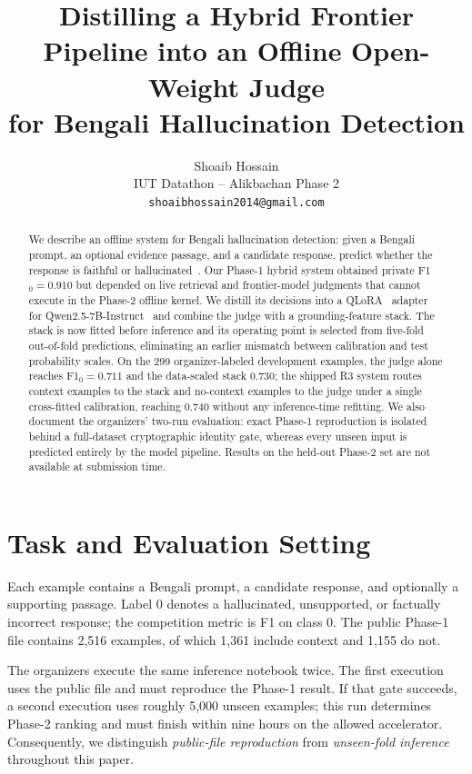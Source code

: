 \documentclass[11pt]{article}
\title{Distilling a Hybrid Frontier Pipeline into an Offline Open-Weight Judge\\
for Bengali Hallucination Detection}
\author{Shoaib Hossain \\
  IUT Datathon -- Alikbachan Phase 2 \\
  \texttt{shoaibhossain2014@gmail.com}}
\begin{document}
\maketitle

\begin{abstract}
We describe an offline system for Bengali hallucination detection: given a Bengali
prompt, an optional evidence passage, and a candidate response, predict whether the
response is faithful or hallucinated~\citep{halu}. Our Phase-1 hybrid system obtained
private F1$_0=0.910$ but depended on live retrieval and frontier-model judgments that
cannot execute in the Phase-2 offline kernel. We distill its decisions into a
QLoRA~\citep{qlora} adapter for Qwen2.5-7B-Instruct~\citep{qwen25} and combine the
judge with a grounding-feature stack. The stack is now fitted before inference and
its operating point is selected from five-fold out-of-fold predictions, eliminating
an earlier mismatch between calibration and test probability scales. On the 299
organizer-labeled development examples, the judge alone reaches F1$_0=0.711$ and the
data-scaled stack $0.730$; the shipped R3 system routes context examples to the stack
and no-context examples to the judge under a single cross-fitted calibration, reaching
$0.740$ without any inference-time refitting. We also document the organizers' two-run
evaluation: exact Phase-1
reproduction is isolated behind a full-dataset cryptographic identity gate, whereas
every unseen input is predicted entirely by the model pipeline. Results on the
held-out Phase-2 set are not available at submission time.
\end{abstract}

\section{Task and Evaluation Setting}

Each example contains a Bengali prompt, a candidate response, and optionally a
supporting passage. Label 0 denotes a hallucinated, unsupported, or factually
incorrect response; the competition metric is F1 on class 0. The public Phase-1
file contains 2,516 examples, of which 1,361 include context and 1,155 do not.

The organizers execute the same inference notebook twice. The first execution uses
the public file and must reproduce the Phase-1 result. If that gate succeeds, a
second execution uses roughly 5,000 unseen examples; this run determines Phase-2
ranking and must finish within nine hours on the allowed accelerator. Consequently,
we distinguish \emph{public-file reproduction} from \emph{unseen-fold inference}
throughout this paper.
\end{document}
